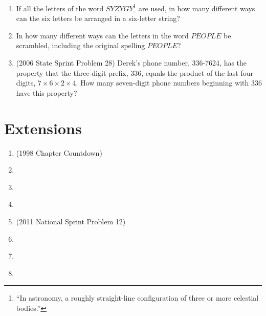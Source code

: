 \documentclass{article}
\begin{document}
\begin{enumerate}
\item If all the letters of the word $SYZYGY$\footnote{``In astronomy, a roughly straight-line configuration of three or more celestial bodies.''} are used, in how many different ways can the six letters be arranged in a six-letter string?\vspace{4cm}
\item In how many different ways can the letters in the word $PEOPLE$ be scrambled, including the original spelling $PEOPLE$?\vspace{4cm}
\item (2006 State Sprint Problem 28) Derek's phone number, 336-7624, has the property that the three-digit prefix, 336, equals the product of the last four digits, $7\times 6\times 2\times 4$. How many seven-digit phone numbers beginning with 336 have this property?
\end{enumerate}


\newpage

\section*{Extensions}
\vspace{1cm}
\begin{enumerate}
\item \underline{\hspace{3in}} (1998 Chapter Countdown)\vspace{1cm}
\item \underline{\hspace{3in}}\vspace{1cm}
\item \underline{\hspace{3in}}\vspace{1cm}
\item \underline{\hspace{3in}}\vspace{1cm}
\item \underline{\hspace{3in}} (2011 National Sprint Problem 12)\vspace{1cm}
\item \underline{\hspace{3in}}\vspace{1cm}
\item \underline{\hspace{3in}}\vspace{1cm}
\item \underline{\hspace{3in}}
\end{enumerate}
\end{document}
